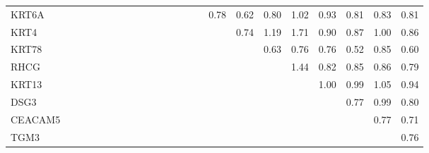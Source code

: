 \begin{longtable}{lrrrrrrrrrrrrrrrrrrrrrr}
KRT6A     &            &            &              &             &              &              &              &               &                 &             &             &             &             &             &       0.78 &        0.62 &       0.80 &        1.02 &       0.93 &          0.81 &       0.83 &           0.81 \\
KRT4      &            &            &              &             &              &              &              &               &                 &             &             &             &             &             &            &        0.74 &       1.19 &        1.71 &       0.90 &          0.87 &       1.00 &           0.86 \\
KRT78     &            &            &              &             &              &              &              &               &                 &             &             &             &             &             &            &             &       0.63 &        0.76 &       0.76 &          0.52 &       0.85 &           0.60 \\
RHCG      &            &            &              &             &              &              &              &               &                 &             &             &             &             &             &            &             &            &        1.44 &       0.82 &          0.85 &       0.86 &           0.79 \\
KRT13     &            &            &              &             &              &              &              &               &                 &             &             &             &             &             &            &             &            &             &       1.00 &          0.99 &       1.05 &           0.94 \\
DSG3      &            &            &              &             &              &              &              &               &                 &             &             &             &             &             &            &             &            &             &            &          0.77 &       0.99 &           0.80 \\
CEACAM5   &            &            &              &             &              &              &              &               &                 &             &             &             &             &             &            &             &            &             &            &               &       0.77 &           0.71 \\
TGM3      &            &            &              &             &              &              &              &               &                 &             &             &             &             &             &            &             &            &             &            &               &            &           0.76 \\
\end{longtable}


